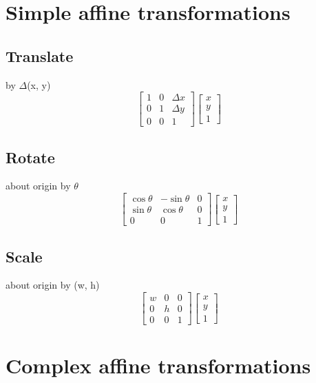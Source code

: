 

\section{Simple affine transformations}

\subsection{Translate}
by $\Delta$(x, y)
\[
\begin{bmatrix}
1 & 0 & \Delta x\\
0 & 1 & \Delta y\\
0 & 0 & 1
\end{bmatrix}
\begin{bmatrix}
x\\
y\\
1
\end{bmatrix}
\]

\subsection{Rotate}
about origin
by $\theta$
\[
\begin{bmatrix}
\cos \theta & -\sin \theta & 0\\
\sin \theta &  \cos \theta & 0\\
0 & 0 & 1
\end{bmatrix}
\begin{bmatrix}
x\\
y\\
1
\end{bmatrix}
\]

\subsection{Scale}
about origin
by (w, h)
\[
\begin{bmatrix}
w & 0 & 0\\
0 & h & 0\\
0 & 0 & 1
\end{bmatrix}
\begin{bmatrix}
x\\
y\\
1
\end{bmatrix}
\]

\section{Complex affine transformations}

